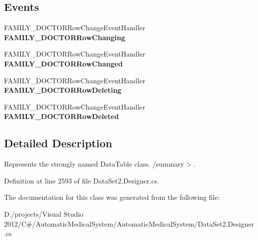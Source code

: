 \subsection*{Events}
\begin{CompactItemize}
\item 
FAMILY\_\-DOCTORRowChangeEventHandler \textbf{FAMILY\_\-DOCTORRowChanging}\label{class_automatic_medical_system_1_1_data_set2_1_1_f_a_m_i_l_y___d_o_c_t_o_r_data_table_2495b5b50e72df2da1721bf019064b82}

\item 
FAMILY\_\-DOCTORRowChangeEventHandler \textbf{FAMILY\_\-DOCTORRowChanged}\label{class_automatic_medical_system_1_1_data_set2_1_1_f_a_m_i_l_y___d_o_c_t_o_r_data_table_35035df2fad84e1504f14f8aa4a069fc}

\item 
FAMILY\_\-DOCTORRowChangeEventHandler \textbf{FAMILY\_\-DOCTORRowDeleting}\label{class_automatic_medical_system_1_1_data_set2_1_1_f_a_m_i_l_y___d_o_c_t_o_r_data_table_07cd278b028cb05f28e37378fd19bf1a}

\item 
FAMILY\_\-DOCTORRowChangeEventHandler \textbf{FAMILY\_\-DOCTORRowDeleted}\label{class_automatic_medical_system_1_1_data_set2_1_1_f_a_m_i_l_y___d_o_c_t_o_r_data_table_3121fb71900f4072449e20e4f32f7de8}

\end{CompactItemize}


\subsection{Detailed Description}
Represents the strongly named DataTable class. /summary$>$. 

Definition at line 2593 of file DataSet2.Designer.cs.

The documentation for this class was generated from the following file:\begin{CompactItemize}
\item 
D:/projects/Visual Studio 2012/C\#/AutomaticMedicalSystem/AutomaticMedicalSystem/DataSet2.Designer.cs\end{CompactItemize}
